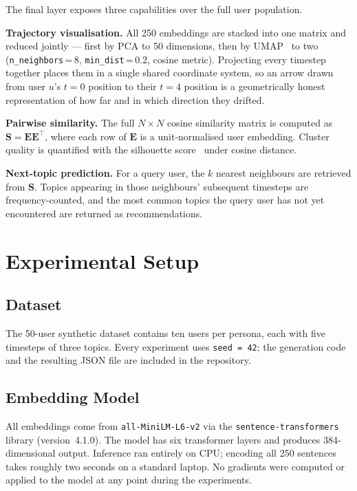 \documentclass[conference]{IEEEtran}
\begin{document}
The final layer exposes three capabilities over the full user
population.

\textbf{Trajectory visualisation.}\enspace
All 250 embeddings are stacked into one matrix and reduced
jointly --- first by PCA to 50 dimensions, then by
UMAP~\cite{mcinnes2018} to two (\texttt{n\_neighbors}\,=\,8,
\texttt{min\_dist}\,=\,0.2, cosine metric). Projecting every
timestep together places them in a single shared coordinate
system, so an arrow drawn from user $u$'s $t{=}0$ position
to their $t{=}4$ position is a geometrically honest
representation of how far and in which direction they drifted.

\textbf{Pairwise similarity.}\enspace
The full $N \times N$ cosine similarity matrix is computed
as $\mathbf{S} = \mathbf{E}\mathbf{E}^{\top}$, where each
row of $\mathbf{E}$ is a unit-normalised user embedding.
Cluster quality is quantified with the silhouette
score~\cite{rousseeuw1987} under cosine distance.

\textbf{Next-topic prediction.}\enspace
For a query user, the $k$ nearest neighbours are retrieved
from $\mathbf{S}$. Topics appearing in those neighbours'
subsequent timesteps are frequency-counted, and the most
common topics the query user has not yet encountered are
returned as recommendations.

\section{Experimental Setup}

\subsection{Dataset}

The 50-user synthetic dataset contains ten users per persona,
each with five timesteps of three topics. Every experiment
uses \texttt{seed\,=\,42}; the generation code and the
resulting JSON file are included in the repository.

\subsection{Embedding Model}

All embeddings come from \texttt{all-MiniLM-L6-v2} via the
\texttt{sentence-transformers} library (version~4.1.0). The
model has six transformer layers and produces 384-dimensional
output. Inference ran entirely on CPU; encoding all 250
sentences takes roughly two seconds on a standard laptop.
No gradients were computed or applied to the model at any
point during the experiments.
\end{document}
